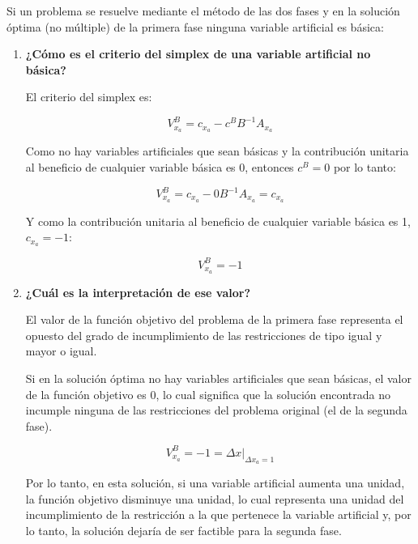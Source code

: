 Si un problema se resuelve mediante el método de las dos fases y en la solución óptima (no múltiple) de la primera fase ninguna variable artificial es básica:
\begin{enumerate}[label=\alph*)]

    \item \textbf{¿Cómo es el criterio del simplex de una variable artificial no básica?}

    El criterio del simplex es: 

    \[
    V^B_{x_a} = c_{x_a} - c^BB^{-1}A_{x_a}
    \]

    Como no hay variables artificiales que sean básicas y la contribución unitaria al beneficio de cualquier variable básica es 0, entonces $c^B=0$ por lo tanto:

    \[
    V^B_{x_a} = c_{x_a} - 0B^{-1}A_{x_a} = c_{x_a} 
    \]

    Y como la contribución unitaria al beneficio de cualquier variable básica es 1, $c_{x_a} = -1$:

    \[
    V^B_{x_a} = -1
    \]

    
    \item \textbf{¿Cuál es la interpretación de ese valor?}

    El valor de la función objetivo del problema de la primera fase representa el opuesto del grado de incumplimiento de las restricciones de tipo igual y mayor o igual.
    
    Si en la solución óptima no hay variables artificiales que sean básicas, el valor de la función objetivo es 0, lo cual significa que la solución encontrada no incumple ninguna de las restricciones del problema original (el de la segunda fase). 

    \[
    V^B_{x_a} = -1  = \Delta x|_{\Delta x_a = 1}
    \]

    Por lo tanto, en esta solución, si una variable artificial aumenta una unidad, la función objetivo disminuye una unidad, lo cual representa una unidad del incumplimiento de la restricción a la que pertenece la variable artificial y, por lo tanto, la solución dejaría de ser factible para la segunda fase. 
    
\end{enumerate}


